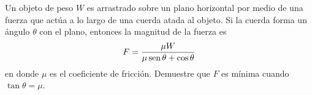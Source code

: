 \item Un objeto de peso $W$ es arrastrado sobre un plano horizontal por medio de una fuerza que actúa a lo largo de una cuerda atada al objeto. Si la cuerda forma un ángulo $\theta$ con el plano, entonces la magnitud de la fuerza es
$$F = \frac{\mu W}{\mu \operatorname{sen} \theta + \cos \theta}$$
en donde $\mu$ es el coeficiente de fricción. Demuestre que $F$ es mínima cuando $\tan \theta = \mu$.
